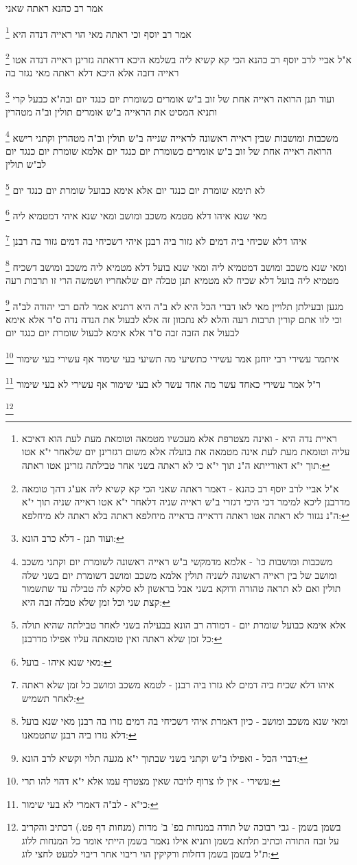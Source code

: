 \documentclass[12pt, openany]{book}
\newcommand{\footnotecomment}[1]{
	\renewcommand\thefootnote{}
	\footnote{#1}}
\newcommand{\commenta}[1]{\footnotecomment{#1}}
\begin{document}
{אמר רב כהנא ראתה שאני 
\commenta{ראיית נדה היא - ואינה מצטרפת אלא מעכשיו מטמאה וטומאת מעת לעת הוא דאיכא עליה וטומאת מעת לעת אינה מטמאה את בועלה אלא משום דגזרינן יום שלאחר י"א אטו תוך י"א דאורייתא ה"נ תוך י"א כי לא ראתה בשני אחר טבילתה גזרינן אטו ראתה:}
אמר רב יוסף וכי ראתה מאי הוי ראייה דנדה היא 
\commenta{א"ל אביי לרב יוסף רב כהנא - דאמר ראתה שאני הכי קא קשיא ליה אע"ג דהך טומאה מדרבנן ליכא למימר דכי היכי דגזרי ב"ש ראייה שניה דלאחר י"א אטו ראייה שניה תוך י"א ה"נ נגזור לא ראתה אטו ראתה דראייה בראייה מיחלפא ראתה בלא ראתה לא מיחלפא:}
א"ל אביי לרב יוסף רב כהנא הכי קא קשיא ליה בשלמא היכא דראתה גזרינן ראייה דנדה אטו ראייה דזבה אלא היכא דלא ראתה מאי נגזר בה 
\commenta{ועוד תנן - דלא כרב הונא:}
ועוד תנן הרואה ראייה אחת של זוב ב"ש אומרים כשומרת יום כנגד יום ובה"א כבעל קרי
ותניא המסיט את הראייה ב"ש אומרים תולין וב"ה מטהרין 
\commenta{משכבות ומושבות כו' - אלמא מדמקשי ב"ש ראייה ראשונה לשומרת יום וקתני משכב ומושב של בין ראייה ראשונה לשניה תולין אלמא משכב ומושב דשומרת יום בשני שלה תולין ואם לא תראה טהורה ודוקא בשני אבל בראשון לא סלקא לה טבילה עד שתשמור קצת שני וכל זמן שלא טבלה זבה היא:}
משכבות ומושבות שבין ראייה ראשונה לראייה שנייה ב"ש תולין וב"ה מטהרין 
וקתני רישא הרואה ראייה אחת של זוב ב"ש אומרים כשומרת יום כנגד יום אלמא שומרת יום כנגד יום לב"ש תולין 
\commenta{אלא אימא כבועל שומרת יום - דמודה רב הונא בבעילה בשני לאחר טבילתה שהיא תולה כל זמן שלא ראתה ואין טומאתה עליו אפילו מדרבנן:}
לא תימא שומרת יום כנגד יום אלא אימא כבועל שומרת יום כנגד יום 
\commenta{מאי שנא איהו - בועל:}
מאי שנא איהו דלא מטמא משכב ומושב ומאי שנא איהי דמטמיא ליה 
\commenta{איהו דלא שכיח ביה דמים לא גזרו ביה רבנן - לטמא משכב ומושב כל זמן שלא ראתה לאחר תשמיש:}
איהו דלא שכיחי ביה דמים לא גזור ביה רבנן איהי דשכיחי בה דמים גזור בה רבנן 
\commenta{ומאי שנא משכב ומושב - כיון דאמרת איהי דשכיחי בה דמים גזרו בה רבנן מאי שנא בועל דלא גזרו ביה רבנן שתטמאנו:}
ומאי שנא משכב ומושב דמטמיא ליה ומאי שנא בועל דלא מטמיא ליה 
משכב ומושב דשכיח מטמיא ליה בועל דלא שכיח לא מטמיא 
תנן טבלה יום שלאחריו ושמשה הרי זו תרבות רעה
\commenta{דברי הכל - ואפילו ב"ש וקתני בשני שבתוך י"א מגעה תלוי וקשיא לרב הונא:}
מגען ובעילתן תלויין מאי לאו דברי הכל היא 
לא ב"ה היא דתניא אמר להם רבי יהודה לב"ה וכי לזו אתם קורין תרבות רעה והלא לא נתכוון זה אלא לבעול את הנדה נדה ס"ד 
אלא אימא לבעול את הזבה זבה ס"ד אלא אימא לבעול שומרת יום כנגד יום 
\commenta{עשירי - אין לו צרוף לזיבה שאין מצטרף עמו אלא י"א דהוי להו תרי:}
איתמר עשירי רבי יוחנן אמר עשירי כתשיעי מה תשיעי בעי שימור אף עשירי בעי שימור 
\commenta{כי"א - לב"ה דאמרי לא בעי שימור:}
ר"ל אמר עשירי כאחד עשר מה אחד עשר לא בעי שימור אף עשירי לא בעי שימור 
\commenta{בשמן בשמן - גבי רבוכה של תודה במנחות בפ' ב' מדות (מנחות דף פט.) דכתיב והקריב על זבח התודה וכתיב תלתא בשמן ותניא אילו נאמר בשמן הייתי אומר כל המנחות ללוג ת"ל בשמן בשמן דחלות ורקיקין הוי ריבוי אחר ריבוי למעט לחצי לוג:}
}
\end{document}
